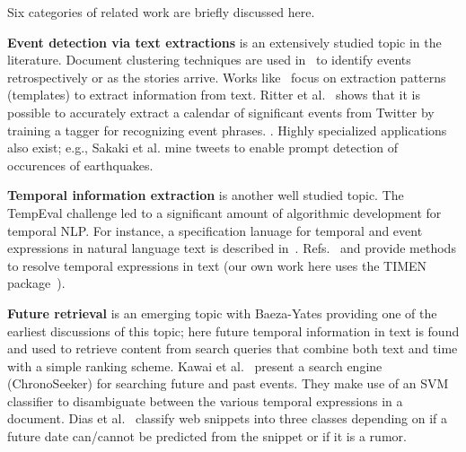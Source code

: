 Six categories of related work 
are briefly discussed here.

{\bf Event detection via text extractions}
is an extensively studied topic in the literature. Document clustering techniques are used 
in~\cite{Allan:2002:TDT, Yang:1998:SRO, Gabrilovich:2004:NPP} to identify events retrospectively or as the stories arrive.
Works like~\cite{Chambers:2011:TIE, Banko07openinformation, riloff2003learning} focus on
extraction patterns (templates) to extract information from text. Ritter et al.~\cite{Ritter:2012} shows that
it is possible to accurately extract a calendar of significant events from Twitter by training a tagger for recognizing event phrases.
\iffalse 
Sankaranarayanan et al.\cite{Sankaranarayanan:2009:TNT} captures tweet clusters of interest to identify late breaking News from twitter 
\fi.
Highly specialized applications
also exist; e.g., Sakaki et al.\cite{Sakaki:2010:EST} mine tweets to enable prompt detection of occurences of earthquakes.

{\bf Temporal information extraction} is another well studied topic.
The TempEval challenge\cite{tempeval} led to a significant amount of
algorithmic development for temporal NLP.
For instance, a specification lanuage
for temporal and event expressions in natural language text is described in~\cite{timeml}.
Refs.~\cite{LlorensDGS12} and \cite{tempex} provide methods to resolve temporal expressions in text (our own
work here uses the TIMEN package~\cite{LlorensDGS12}).

{\bf Future retrieval} is an emerging topic with 
Baeza-Yates\cite{baeza2005searching} providing one of the earliest discussions
of this topic; here future temporal information in text is found and used to retrieve content from search queries that 
combine both text and time with a simple ranking scheme. Kawai et al.~\cite{Kawai:2010:CSE} present a search engine (ChronoSeeker) for searching 
future and past events.
They make use of an SVM classifier to disambiguate between the various temporal expressions in a document.
Dias et al.~\cite{dias2011future} classify web snippets into three classes depending on if a future date can/cannot be predicted 
from the snippet or if it is a rumor.


